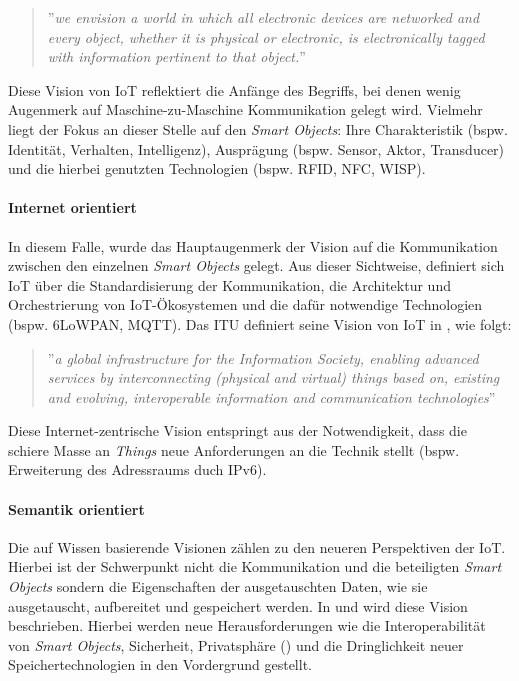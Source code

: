 \begin{quote}
    ''\textit{we envision a world in which all electronic devices are networked and every object, whether it is physical or electronic, is electronically tagged with information pertinent to that object.}''
\end{quote}

Diese Vision von \ac{IoT} reflektiert die Anfänge des Begriffs, bei denen wenig Augenmerk auf Maschine-zu-Maschine Kommunikation gelegt wird. Vielmehr liegt der Fokus an dieser Stelle auf den \textit{Smart Objects}: Ihre Charakteristik (bspw. Identität, Verhalten, Intelligenz), Ausprägung (bspw. Sensor, Aktor, Transducer) und die hierbei genutzten Technologien (bspw. RFID, NFC, WISP).

\paragraph{Internet orientiert} In diesem Falle, wurde das Hauptaugenmerk der Vision auf die Kommunikation zwischen den einzelnen \textit{Smart Objects} gelegt. Aus dieser Sichtweise, definiert sich \ac{IoT} über die Standardisierung der Kommunikation, die Architektur und Orchestrierung von \ac{IoT}-Ökosystemen und die dafür notwendige Technologien (bspw. 6LoWPAN, MQTT). Das \ac{ITU} definiert seine Vision von \ac{IoT} in \cite{itut2012}, wie folgt: 

\begin{quote}
''\textit{a global infrastructure for the Information Society, enabling advanced services by interconnecting (physical and virtual) things based on, existing and evolving, interoperable information and communication technologies}''
\end{quote}

Diese Internet-zentrische Vision entspringt aus der Notwendigkeit, dass die schiere Masse an \textit{Things} neue Anforderungen an die Technik stellt (bspw. Erweiterung des Adressraums duch IPv6). 

\paragraph{Semantik orientiert} Die auf Wissen basierende Visionen zählen zu den neueren Perspektiven der \ac{IoT}. Hierbei ist der Schwerpunkt nicht die Kommunikation und die beteiligten \textit{Smart Objects} sondern die Eigenschaften der ausgetauschten Daten, wie sie ausgetauscht, aufbereitet und gespeichert werden. In \cite{Kotis2012} und \cite{Singh2014} wird diese Vision beschrieben. Hierbei werden neue Herausforderungen wie die Interoperabilität von \textit{Smart Objects}, Sicherheit, Privatsphäre (\cite{weber2010internet}) und die Dringlichkeit neuer Speichertechnologien in den Vordergrund gestellt.

